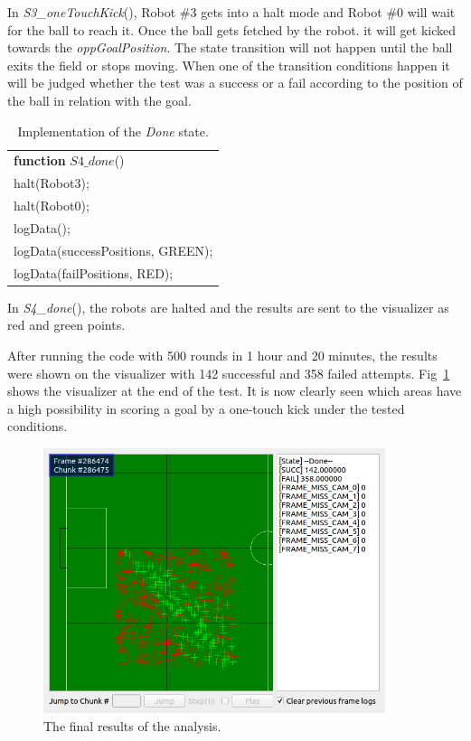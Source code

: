 \documentclass[runningheads]{llncs}
\begin{document}
In \textit{S3\_oneTouchKick}(), Robot \#3 gets into a halt mode and Robot \#0 will wait for the ball to reach it. Once the ball gets fetched by the robot. it will get kicked towards the \textit{oppGoalPosition}. The state transition will not happen until the ball exits the field or stops moving. When one of the transition conditions happen it will be judged whether the test was a success or a fail according to the position of the ball in relation with the goal.

\begin{table}[H]
\caption{Implementation of the \textit{Done} state.}
\center
\label{table_STATE4_IMP}
\begin{tabular}{|p{10cm}|}
\hline

\textbf{function}
$ S4\_done$()\\
\quad halt(Robot3);\\
\quad halt(Robot0);\\
\quad logData();\\
\quad logData(successPositions, GREEN);\\
\quad logData(failPositions, RED);\\

\hline
\end{tabular}
\end{table}

In \textit{S4\_done}(), the robots are halted and the results are sent to the visualizer as red and green points.

After running the code with 500 rounds in 1 hour and 20 minutes, the results were shown on the visualizer with 142 successful and 358 failed attempts. Fig~\ref{fig_ANALYZE_OUTPUT} shows the visualizer at the end of the test. It is now clearly seen which areas have a high possibility in scoring a goal by a one-touch kick under the tested conditions.

\begin{figure}[H]
\centering
\includegraphics[width=10cm]{images/Analyze_output.png}\caption{The final results of the analysis.} \label{fig_ANALYZE_OUTPUT}
\end{figure}
\end{document}
